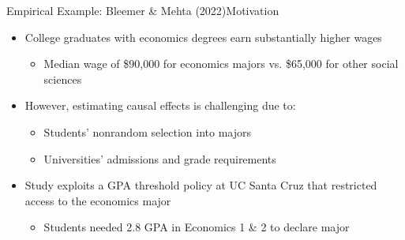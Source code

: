 \documentclass[hyperref={pdfpagelabels=false}]{beamer}
\begin{document}
\begin{frame}{Empirical Example: Bleemer \& Mehta (2022)}{Motivation}
	\begin{itemize}
		\item College graduates with economics degrees earn substantially higher wages
		\vspace{0.2cm}
		\begin{itemize}
			\item Median wage of \$90,000 for economics majors vs. \$65,000 for other social sciences
		\end{itemize}
		
		\vspace{0.2cm}
		\item However, estimating causal effects is challenging due to:
					\vspace{0.2cm}
		\begin{itemize}
			\item Students' nonrandom selection into majors
			\vspace{0.2cm}
			\item Universities' admissions and grade requirements
		\end{itemize}
		
		\vspace{0.2cm}
		\item Study exploits a GPA threshold policy at UC Santa Cruz that restricted access to the economics major
		\begin{itemize}
						\vspace{0.2cm}
			\item Students needed 2.8 GPA in Economics 1 \& 2 to declare major
		\end{itemize}
		
	\end{itemize}
\end{frame}
\end{document}
